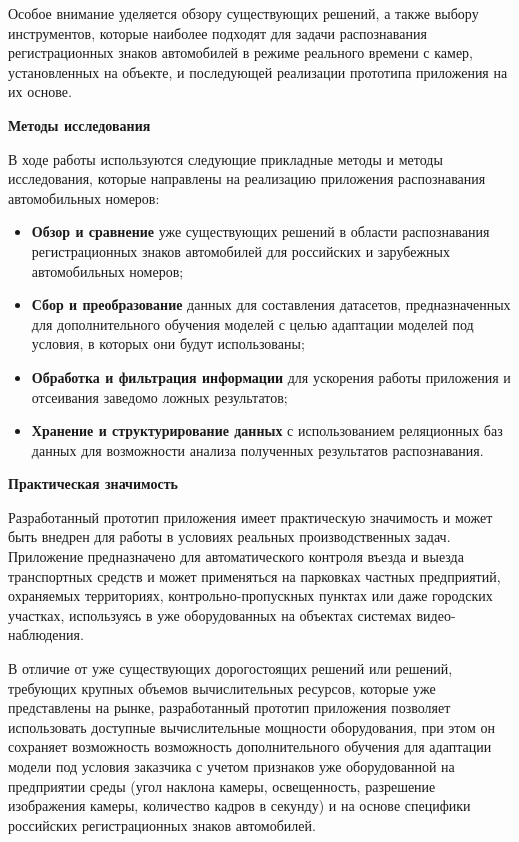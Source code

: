 \documentclass[a4paper,12pt]{article}
\begin{document}
Особое внимание уделяется обзору существующих решений, а также выбору инструментов, которые наиболее подходят для задачи распознавания регистрационных знаков автомобилей в режиме реального времени с камер, установленных на объекте, и последующей реализации прототипа приложения на их основе.

\textbf{Методы исследования}

В ходе работы используются следующие прикладные методы и методы исследования, которые направлены на реализацию приложения распознавания автомобильных номеров:
\begin{itemize}
    \item \textbf{Обзор и сравнение} уже существующих решений в области распознавания регистрационных знаков автомобилей для российских и зарубежных автомобильных номеров;
    \item \textbf{Сбор и преобразование} данных для составления датасетов, предназначенных для дополнительного обучения моделей с целью адаптации моделей под условия, в которых они будут использованы;
    \item \textbf{Обработка и фильтрация информации} для ускорения работы приложения и отсеивания заведомо ложных результатов;
    \item \textbf{Хранение и структурирование данных} с использованием реляционных баз данных для возможности анализа полученных результатов распознавания.
\end{itemize}

\textbf{Практическая значимость}

Разработанный прототип приложения имеет практическую значимость и может быть внедрен для работы в условиях реальных производственных задач. Приложение предназначено для автоматического контроля въезда и выезда транспортных средств и может применяться на парковках частных предприятий, охраняемых территориях, контрольно-пропускных пунктах или даже городских участках, используясь в уже оборудованных на объектах системах видео-наблюдения. 

В отличие от уже существующих дорогостоящих решений или решений, требующих крупных объемов вычислительных ресурсов, которые уже представлены на рынке, разработанный прототип приложения позволяет использовать доступные вычислительные мощности оборудования, при этом он сохраняет возможность возможность дополнительного обучения для адаптации модели под условия заказчика с учетом признаков уже оборудованной на предприятии среды (угол наклона камеры, освещенность, разрешение изображения камеры, количество кадров в секунду) и на основе специфики российских регистрационных знаков автомобилей.
\end{document}
